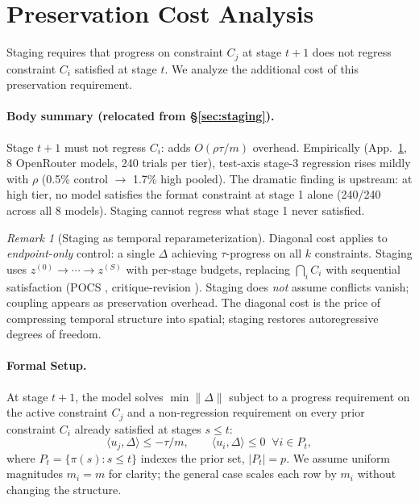 \documentclass{article}
\theoremstyle{plain}
\theoremstyle{definition}
\theoremstyle{remark}
\newtheorem{remark}[theorem]{Remark}
\newcommand{\appref}[1]{App.~\ref{#1}}
\begin{document}
\section{Preservation Cost Analysis}\label{app:preservation}

Staging requires that progress on constraint $C_j$ at stage $t{+}1$ does not regress constraint $C_i$ satisfied at stage $t$. We analyze the additional cost of this preservation requirement.

\paragraph{Body summary (relocated from \S\ref{sec:staging}).}
Stage $t{+}1$ must not regress $C_i$: adds $O(\rho\tau/m)$ overhead. Empirically (\appref{app:preservation}, 8 OpenRouter models, 240 trials per tier), test-axis stage-3 regression rises mildly with $\rho$ (0.5\% control $\to$ 1.7\% high pooled). The dramatic finding is upstream: at high tier, no model satisfies the format constraint at stage 1 alone (240/240 across all 8 models). Staging cannot regress what stage 1 never satisfied.

\begin{remark}[Staging as temporal reparameterization]\label{rem:staging_lift}
Diagonal cost applies to \emph{endpoint-only} control: a single $\Delta$ achieving $\tau$-progress on all $k$ constraints. Staging uses $z^{(0)} \to \cdots \to z^{(S)}$ with per-stage budgets, replacing $\bigcap_i C_i$ with sequential satisfaction (POCS \citep{bauschke1996projection}, critique-revision \citep{bai2022constitutional}). Staging does \emph{not} assume conflicts vanish; coupling appears as preservation overhead. The diagonal cost is the price of compressing temporal structure into spatial; staging restores autoregressive degrees of freedom.
\end{remark}

\paragraph{Formal Setup.}
At stage $t{+}1$, the model solves $\min \|\Delta\|$ subject to a progress requirement on the active constraint $C_j$ and a non-regression requirement on every prior constraint $C_i$ already satisfied at stages $s \le t$:
\[
\langle u_j, \Delta\rangle \le -\tau/m, \qquad \langle u_i, \Delta\rangle \le 0 \;\; \forall i \in P_t,
\]
where $P_t = \{\pi(s) : s \le t\}$ indexes the prior set, $|P_t| = p$. We assume uniform magnitudes $m_i = m$ for clarity; the general case scales each row by $m_i$ without changing the structure.
\end{document}
